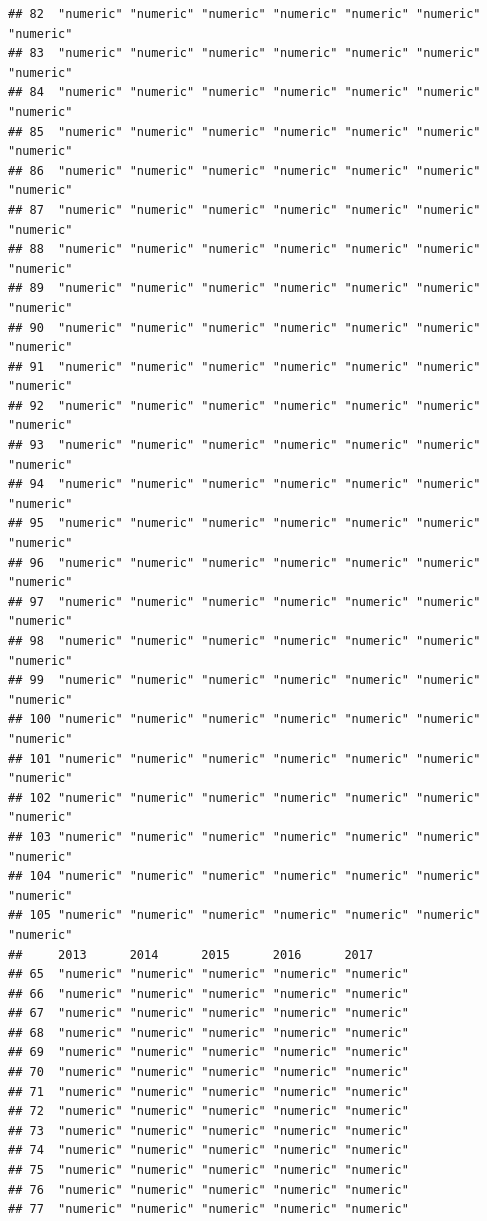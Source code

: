 \documentclass[
]{book}
\theoremstyle{definition}
\theoremstyle{definition}
\theoremstyle{definition}
\theoremstyle{definition}
\theoremstyle{remark}
\begin{document}
\begin{verbatim}
## 82  "numeric" "numeric" "numeric" "numeric" "numeric" "numeric" "numeric"
## 83  "numeric" "numeric" "numeric" "numeric" "numeric" "numeric" "numeric"
## 84  "numeric" "numeric" "numeric" "numeric" "numeric" "numeric" "numeric"
## 85  "numeric" "numeric" "numeric" "numeric" "numeric" "numeric" "numeric"
## 86  "numeric" "numeric" "numeric" "numeric" "numeric" "numeric" "numeric"
## 87  "numeric" "numeric" "numeric" "numeric" "numeric" "numeric" "numeric"
## 88  "numeric" "numeric" "numeric" "numeric" "numeric" "numeric" "numeric"
## 89  "numeric" "numeric" "numeric" "numeric" "numeric" "numeric" "numeric"
## 90  "numeric" "numeric" "numeric" "numeric" "numeric" "numeric" "numeric"
## 91  "numeric" "numeric" "numeric" "numeric" "numeric" "numeric" "numeric"
## 92  "numeric" "numeric" "numeric" "numeric" "numeric" "numeric" "numeric"
## 93  "numeric" "numeric" "numeric" "numeric" "numeric" "numeric" "numeric"
## 94  "numeric" "numeric" "numeric" "numeric" "numeric" "numeric" "numeric"
## 95  "numeric" "numeric" "numeric" "numeric" "numeric" "numeric" "numeric"
## 96  "numeric" "numeric" "numeric" "numeric" "numeric" "numeric" "numeric"
## 97  "numeric" "numeric" "numeric" "numeric" "numeric" "numeric" "numeric"
## 98  "numeric" "numeric" "numeric" "numeric" "numeric" "numeric" "numeric"
## 99  "numeric" "numeric" "numeric" "numeric" "numeric" "numeric" "numeric"
## 100 "numeric" "numeric" "numeric" "numeric" "numeric" "numeric" "numeric"
## 101 "numeric" "numeric" "numeric" "numeric" "numeric" "numeric" "numeric"
## 102 "numeric" "numeric" "numeric" "numeric" "numeric" "numeric" "numeric"
## 103 "numeric" "numeric" "numeric" "numeric" "numeric" "numeric" "numeric"
## 104 "numeric" "numeric" "numeric" "numeric" "numeric" "numeric" "numeric"
## 105 "numeric" "numeric" "numeric" "numeric" "numeric" "numeric" "numeric"
##     2013      2014      2015      2016      2017     
## 65  "numeric" "numeric" "numeric" "numeric" "numeric"
## 66  "numeric" "numeric" "numeric" "numeric" "numeric"
## 67  "numeric" "numeric" "numeric" "numeric" "numeric"
## 68  "numeric" "numeric" "numeric" "numeric" "numeric"
## 69  "numeric" "numeric" "numeric" "numeric" "numeric"
## 70  "numeric" "numeric" "numeric" "numeric" "numeric"
## 71  "numeric" "numeric" "numeric" "numeric" "numeric"
## 72  "numeric" "numeric" "numeric" "numeric" "numeric"
## 73  "numeric" "numeric" "numeric" "numeric" "numeric"
## 74  "numeric" "numeric" "numeric" "numeric" "numeric"
## 75  "numeric" "numeric" "numeric" "numeric" "numeric"
## 76  "numeric" "numeric" "numeric" "numeric" "numeric"
## 77  "numeric" "numeric" "numeric" "numeric" "numeric"

\end{verbatim}
\end{document}
